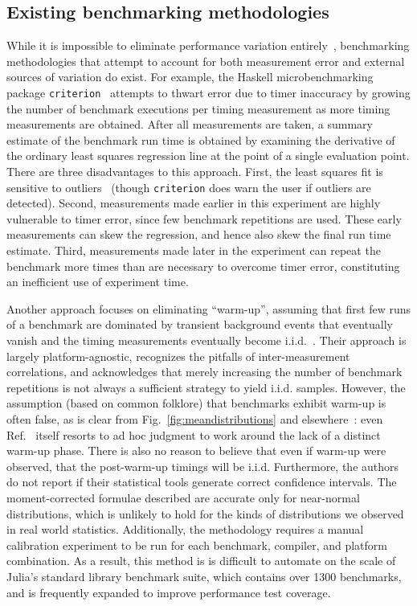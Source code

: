 \documentclass[conference]{IEEEtran}
\begin{document}
\subsection{Existing benchmarking methodologies}
\label{sec:existingtools}

While it is impossible to eliminate performance variation
entirely~\cite{Alcocer2015,Barrett2016}, benchmarking methodologies that attempt to account
for both measurement error and external sources of variation do exist. For example, the
Haskell microbenchmarking package \lstinline|criterion|~\cite{criterion} attempts to thwart
error due to timer inaccuracy by growing the number of benchmark executions per timing
measurement as more timing measurements are obtained. After all measurements are taken, a
summary estimate of the benchmark run time is obtained by examining the derivative of the
ordinary least squares regression line at the point of a single evaluation point. There are
three disadvantages to this approach. First, the least squares fit is sensitive to
outliers~\cite{Maronna2006} (though \lstinline|criterion| does warn the user if outliers are
detected). Second, measurements made earlier in this experiment are highly vulnerable to
timer error, since few benchmark repetitions are used. These early measurements can skew the
regression, and hence also skew the final run time estimate. Third, measurements made later in
the experiment can repeat the benchmark more times than are necessary to overcome timer
error, constituting an inefficient use of experiment time.

Another approach focuses on eliminating ``warm-up'', assuming that first few
runs of a benchmark are dominated by transient background events that
eventually vanish and the timing measurements eventually become
i.i.d.~\cite{Kalibera2013}. Their approach is largely platform-agnostic,
recognizes the pitfalls of inter-measurement correlations, and
acknowledges that merely increasing the number of benchmark repetitions is not always a
sufficient strategy to yield i.i.d. samples. However, the assumption (based on
common folklore) that benchmarks exhibit warm-up is often false, as is clear
from Fig.~\ref{fig:meandistributions} and elsewhere~\cite{Barrett2016}:
even Ref.~\cite{Kalibera2013} itself resorts to ad hoc judgment to work
around the lack of a distinct warm-up phase. There is also no reason to believe that even if warm-up were observed, that the post-warm-up timings will be i.i.d.
Furthermore, the authors do not report if their statistical tools generate
correct confidence intervals. The moment-corrected formulae described are
accurate only for near-normal distributions, which is unlikely to hold for the
kinds of distributions we observed in real world statistics. Additionally, the
methodology requires a manual calibration experiment to be run for each
benchmark, compiler, and platform combination. As a result, this method is is
difficult to automate on the scale of Julia's standard library benchmark suite,
which contains over 1300 benchmarks, and is frequently expanded to improve
performance test coverage.
\end{document}
